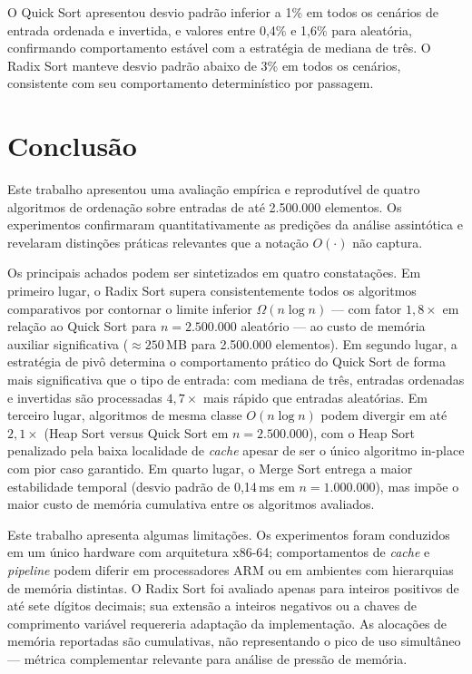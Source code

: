 \documentclass[12pt]{article}
\begin{document}
O Quick Sort apresentou desvio padrão inferior a 1\% em todos
os cenários de entrada ordenada e invertida, e valores entre
0,4\% e 1,6\% para aleatória, confirmando comportamento estável
com a estratégia de mediana de três. O Radix Sort manteve desvio
padrão abaixo de 3\% em todos os cenários, consistente com seu
comportamento determinístico por passagem.

\section{Conclusão}
\label{sec:conclusion}

Este trabalho apresentou uma avaliação empírica e reprodutível de
quatro algoritmos de ordenação sobre entradas de até 2.500.000
elementos. Os experimentos confirmaram quantitativamente as predições
da análise assintótica e revelaram distinções práticas relevantes
que a notação $O(\cdot)$ não captura.

Os principais achados podem ser sintetizados em quatro constatações.
Em primeiro lugar, o Radix Sort supera consistentemente todos os
algoritmos comparativos por contornar o limite inferior $\Omega(n \log n)$
--- com fator $1{,}8\times$ em relação ao Quick Sort para $n = 2.500.000$
aleatório --- ao custo de memória auxiliar significativa ($\approx 250$\,MB
para 2.500.000 elementos). Em segundo lugar, a estratégia de pivô
determina o comportamento prático do Quick Sort de forma mais
significativa que o tipo de entrada: com mediana de três, entradas
ordenadas e invertidas são processadas $4{,}7\times$ mais rápido
que entradas aleatórias. Em terceiro lugar, algoritmos de mesma
classe $O(n \log n)$ podem divergir em até $2{,}1\times$ (Heap Sort
versus Quick Sort em $n = 2.500.000$), com o Heap Sort penalizado
pela baixa localidade de \textit{cache} apesar de ser o único
algoritmo in-place com pior caso garantido. Em quarto lugar, o Merge
Sort entrega a maior estabilidade temporal (desvio padrão de 0,14\,ms
em $n = 1.000.000$), mas impõe o maior custo de memória cumulativa
entre os algoritmos avaliados.

Este trabalho apresenta algumas limitações. Os experimentos foram
conduzidos em um único hardware com arquitetura x86-64; comportamentos
de \textit{cache} e \textit{pipeline} podem diferir em processadores
ARM ou em ambientes com hierarquias de memória distintas. O Radix Sort
foi avaliado apenas para inteiros positivos de até sete dígitos
decimais; sua extensão a inteiros negativos ou a chaves de comprimento
variável requereria adaptação da implementação. As alocações de
memória reportadas são cumulativas, não representando o pico de
uso simultâneo --- métrica complementar relevante para análise
de pressão de memória.
\end{document}
